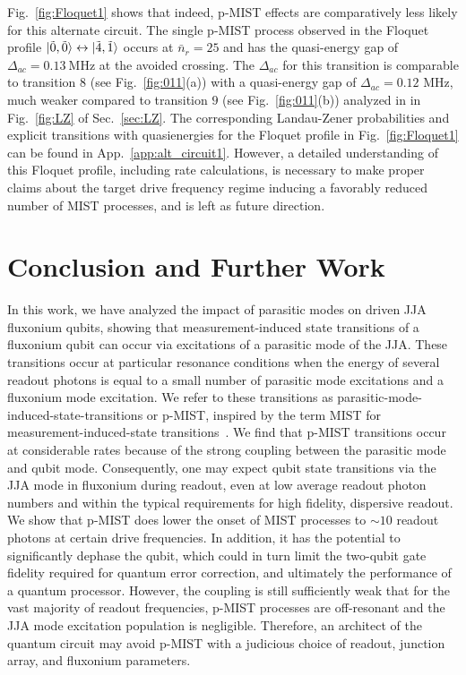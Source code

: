 \documentclass[%
reprint,
superscriptaddress,
 amsmath,amssymb,
 aps,
 prx,
longbibliography,
floatfix,
]{revtex4-2}
\begin{document}
Fig.~\ref{fig:Floquet1} shows that indeed, p-MIST effects are comparatively less likely for this alternate circuit. The single p-MIST process observed in the Floquet profile $\ket{\tilde{0},\tilde{0}}\leftrightarrow\ket{\tilde{4},\tilde{1}}$ occurs at $\bar n_r=25$ and has the quasi-energy gap of $\Delta_{ac}=0.13 \ \mathrm{MHz}$ at the avoided crossing. The $\Delta_{ac}$ for this transition is comparable to transition $8$ (see Fig.~\ref{fig:011}(a)) with a quasi-energy gap of $\Delta_{ac}=0.12$ MHz, much weaker compared to transition $9$ (see Fig.~\ref{fig:011}(b)) analyzed in in Fig.~\ref{fig:LZ} of Sec.~\ref{sec:LZ}. The corresponding Landau-Zener probabilities and explicit transitions with quasienergies for the Floquet profile in Fig.~\ref{fig:Floquet1} can be found in App.~\ref{app:alt_circuit1}. However, a detailed understanding of this Floquet profile, including rate calculations, is necessary to make proper claims about the target drive frequency regime inducing a favorably reduced number of MIST processes, and is left as future direction.

\section{Conclusion and Further Work}\label{sec:conclusion}
In this work, we have analyzed the impact of parasitic modes on driven JJA fluxonium qubits, showing that measurement-induced state transitions of a fluxonium qubit can occur via excitations of a parasitic mode of the JJA. These transitions occur at particular resonance conditions when the energy of several readout photons is equal to a small number of parasitic mode excitations and a fluxonium mode excitation.  
We refer to these transitions as parasitic-mode-induced-state-transitions or p-MIST, inspired by the term MIST for measurement-induced-state transitions~\cite{sank2016measurement}. We find that p-MIST transitions occur at considerable rates because of the strong coupling between the parasitic mode and qubit mode. Consequently, one may expect qubit state transitions via the JJA mode in fluxonium during readout, even at low average readout photon numbers and within the typical requirements for high fidelity, dispersive readout. We show that p-MIST does lower the onset of MIST processes to $\sim 10$ readout photons at certain drive frequencies. In addition, it has the potential to significantly dephase the qubit, which could in turn limit the two-qubit gate fidelity required for quantum error correction, and ultimately the performance of a quantum processor. However, the coupling is still sufficiently weak that for the vast majority of readout frequencies, p-MIST processes are off-resonant and the JJA mode excitation population is negligible. Therefore, an architect of the quantum circuit may avoid p-MIST with a judicious choice of readout, junction array, and fluxonium parameters.
\end{document}

